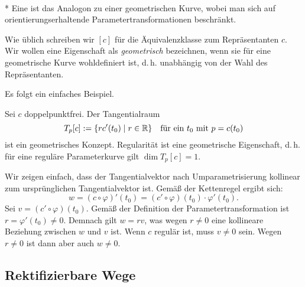 \begin{definition}\mbox{}\\*
Eine  ist das Analogon zu einer
geometrischen Kurve, wobei man sich auf orientierungserhaltende
Parametertransformationen beschränkt.
\end{definition}

\noindent
Wie üblich schreiben wir $[c]$ für die Äquivalenzklasse zum
Repräsentanten $c$. Wir wollen eine Eigenschaft als
\emph{geometrisch} bezeichnen, wenn sie für eine geometrische Kurve
wohldefiniert ist, d.\,h. unabhängig von der Wahl des Repräsentanten.

Es folgt ein einfaches Beispiel.

\begin{corollary}
Sei $c$ doppelpunktfrei. Der Tangentialraum
\begin{equation}
T_p[c] := \{rc'(t_0)\mid r\in\mathbb R\}
\quad\text{für ein $t_0$ mit $p=c(t_0)$}
\end{equation}
ist ein geometrisches Konzept. Regularität ist eine geometrische
Eigenschaft, d.\,h. für eine reguläre Parameterkurve gilt
$\dim T_p[c]=1$.
\end{corollary}

\noindent{}
Wir zeigen einfach, dass der Tangentialvektor nach Umparametrisierung
kollinear zum ursprünglichen Tangentialvektor ist. Gemäß der
Kettenregel ergibt sich:%
\begin{equation}
w = (c\circ\varphi)'(t_0) = (c'\circ\varphi)(t_0)\cdot \varphi'(t_0).
\end{equation}
Sei $v=(c'\circ\varphi)(t_0)$. Gemäß der Definition der
Parametertransformation ist $r=\varphi'(t_0)\ne 0$. Demnach
gilt $w=rv$, was wegen $r\ne 0$ eine kollineare Beziehung zwischen
$w$ und $v$ ist. Wenn $c$ regulär ist, muss $v\ne 0$ sein.
Wegen $r\ne 0$ ist dann aber auch $w\ne 0$.\;\qedsymbol


\subsection{Rektifizierbare Wege}

